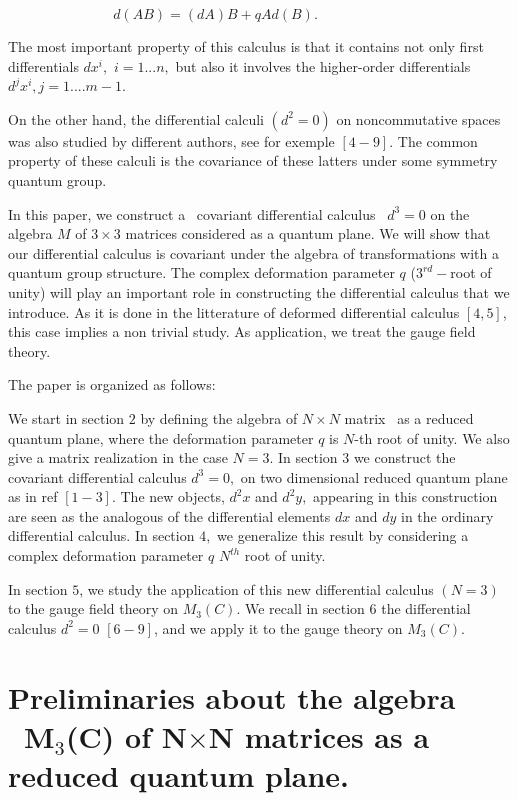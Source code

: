 \documentclass[a4paper,12pt,thmsa]{article}
\begin{document}
$\ \ \ \ \ \ \ \ \ \ \ \ \ \ \ \ \ \ \ \ \ \ \ \ \ \ \ \ \ \ \ \ \ \
d(AB)=(dA)B+qAd(B).$

The most important property of this calculus is that it contains not only
first differentials $dx^i,$ $i=1...n,$ but also it involves the higher-order
differentials $d^jx^i,j=1....m-1$.

On the other hand, the differential calculi $(d^2=0)$ on noncommutative
spaces was also studied by different authors, see for exemple $[4-9].$ The
common property of these calculi is the covariance of these latters under
some symmetry quantum group.

In this paper, we construct a \ covariant differential calculus \ $d^3=0$ on
the algebra $M$ of $3\times 3$ matrices considered as a quantum plane. We
will show that our differential calculus is covariant under the algebra of
transformations with a quantum group structure. The complex deformation
parameter $q$ ($3^{rd}-$root of unity) will play an important role in
constructing the differential calculus that we introduce. As it is done in
the litterature of deformed differential calculus $\left[ 4,5\right] $, this
case implies a non trivial study. As application, we treat the gauge field
theory.

The paper is organized as follows:

We start in section $2$ by defining the algebra of $N\times N$ matrix \ as a
reduced quantum plane, where the deformation parameter $q$ is $N$-th root of
unity. We also give a matrix realization in the case $N=3$. In section $3$
we construct the covariant differential calculus $d^3=0,$ on two dimensional
reduced quantum plane as in ref $\left[ 1-3\right] $. The new objects, $d^2x$
and $d^2y,$ appearing in this construction are seen as the analogous of the
differential elements $dx$ and $dy$ in the ordinary differential calculus.
In section $4,$ we generalize this result by considering a complex
deformation parameter $q$ $N^{th}$ root of unity.

In section $5$, we study the application of this new differential calculus $%
(N=3)$ to the gauge field theory on $M_3(C).$ We recall in section $6$ the
differential calculus $d^2=0$ $\left[ 6-9\right] $, and we apply it to the
gauge theory on $M_3(C)$.

\section{Preliminaries about the algebra \ M$_3$(C) of N$\times $N matrices
as a reduced quantum plane.}
\end{document}
